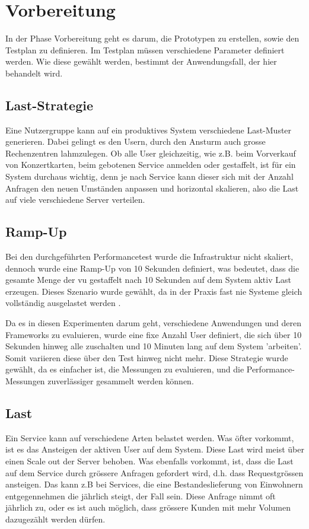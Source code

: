 \documentclass[main.tex]{subfiles}
\begin{document}
\section{Vorbereitung}
In der Phase Vorbereitung geht es darum, die Prototypen zu erstellen, sowie den Testplan zu definieren. 
Im Testplan müssen verschiedene Parameter definiert werden. Wie diese gewählt werden, bestimmt der Anwendungsfall, der hier behandelt wird.

\subsection{Last-Strategie}
Eine Nutzergruppe kann auf ein produktives System verschiedene Last-Muster generieren. Dabei gelingt es den Usern, durch den Ansturm auch grosse Rechenzentren lahmzulegen. Ob alle User gleichzeitig, wie z.B. beim Vorverkauf von Konzertkarten, beim gebotenen Service anmelden oder gestaffelt, ist für ein System durchaus wichtig, denn je nach Service kann dieser sich mit der Anzahl Anfragen den neuen Umständen anpassen und horizontal skalieren, also die Last auf viele verschiedene Server verteilen.

\subsection{Ramp-Up}
Bei den durchgeführten Performancetest wurde die Infrastruktur nicht skaliert, dennoch wurde eine Ramp-Up von 10 Sekunden definiert, was bedeutet, dass die gesamte Menge der \acrshort{vu} gestaffelt nach 10 Sekunden auf dem System aktiv Last erzeugen. Dieses Szenario wurde gewählt, da in der Praxis fast nie Systeme gleich vollständig ausgelastet werden \cite[Kap.~4]{Halili:2008:AJ:1481606}.

Da es in diesen Experimenten darum geht, verschiedene Anwendungen und deren Frameworks zu evaluieren, wurde eine fixe Anzahl User definiert, die sich über 10 Sekunden hinweg alle zuschalten und 10 Minuten lang auf dem System 'arbeiten'. Somit variieren diese über den Test hinweg nicht mehr. Diese Strategie wurde gewählt, da es einfacher ist, die Messungen zu evaluieren, und die Performance-Messungen zuverlässiger gesammelt werden können. 

\subsection{Last}
Ein Service kann auf verschiedene Arten belastet werden. Was öfter vorkommt, ist es das Ansteigen der aktiven User auf dem System. Diese Last wird meist über einen Scale out der Server behoben. Was ebenfalls vorkommt, ist, dass die Last auf dem Service durch grössere Anfragen gefordert wird, d.h. dass Requestgrössen ansteigen. Das kann z.B bei Services, die eine Bestandeslieferung von Einwohnern entgegennehmen die jährlich steigt, der Fall sein. Diese Anfrage nimmt oft jährlich zu, oder es ist auch möglich, dass grössere Kunden mit mehr Volumen dazugezählt werden dürfen. 
\end{document}
